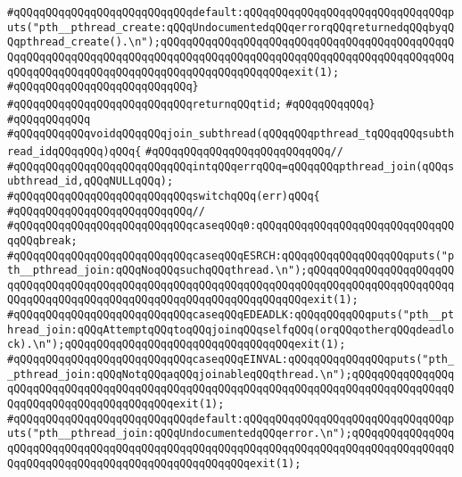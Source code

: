 \verb|#qQQqqQQqqQQqqQQqqQQqqQQqqQQqdefault:qQQqqQQqqQQqqQQqqQQqqQQqqQQqqQQqputs("pth__pthread_create:qQQqUndocumentedqQQqerrorqQQqreturnedqQQqbyqQQqpthread_create().\n");qQQqqQQqqQQqqQQqqQQqqQQqqQQqqQQqqQQqqQQqqQQqqQQqqQQqqQQqqQQqqQQqqQQqqQQqqQQqqQQqqQQqqQQqqQQqqQQqqQQqqQQqqQQqqQQqqQQqqQQqqQQqqQQqqQQqqQQqqQQqqQQqqQQqqQQqqQQqqQQqexit(1);|\newline
\verb|#qQQqqQQqqQQqqQQqqQQqqQQqqQQq}|\newline
\verb|#qQQqqQQqqQQqqQQqqQQqqQQqqQQqreturnqQQqtid;|\newline
\verb|#qQQqqQQqqQQq}|\newline
\verb|#qQQqqQQqqQQq|\newline
\verb|#qQQqqQQqqQQqvoidqQQqqQQqjoin_subthread(qQQqqQQqpthread_tqQQqqQQqsubthread_idqQQqqQQq)qQQq{|\newline
\verb|#qQQqqQQqqQQqqQQqqQQqqQQqqQQq//|\newline
\verb|#qQQqqQQqqQQqqQQqqQQqqQQqqQQqintqQQqerrqQQq=qQQqqQQqpthread_join(qQQqsubthread_id,qQQqNULLqQQq);|\newline
\verb|#qQQqqQQqqQQqqQQqqQQqqQQqqQQqswitchqQQq(err)qQQq{|\newline
\verb|#qQQqqQQqqQQqqQQqqQQqqQQqqQQq//|\newline
\verb|#qQQqqQQqqQQqqQQqqQQqqQQqqQQqcaseqQQq0:qQQqqQQqqQQqqQQqqQQqqQQqqQQqqQQqqQQqbreak;|\newline
\verb|#qQQqqQQqqQQqqQQqqQQqqQQqqQQqcaseqQQqESRCH:qQQqqQQqqQQqqQQqqQQqputs("pth__pthread_join:qQQqNoqQQqsuchqQQqthread.\n");qQQqqQQqqQQqqQQqqQQqqQQqqQQqqQQqqQQqqQQqqQQqqQQqqQQqqQQqqQQqqQQqqQQqqQQqqQQqqQQqqQQqqQQqqQQqqQQqqQQqqQQqqQQqqQQqqQQqqQQqqQQqqQQqqQQqqQQqqQQqexit(1);|\newline
\verb|#qQQqqQQqqQQqqQQqqQQqqQQqqQQqcaseqQQqEDEADLK:qQQqqQQqqQQqputs("pth__pthread_join:qQQqAttemptqQQqtoqQQqjoinqQQqselfqQQq(orqQQqotherqQQqdeadlock).\n");qQQqqQQqqQQqqQQqqQQqqQQqqQQqqQQqqQQqexit(1);|\newline
\verb|#qQQqqQQqqQQqqQQqqQQqqQQqqQQqcaseqQQqEINVAL:qQQqqQQqqQQqqQQqputs("pth__pthread_join:qQQqNotqQQqaqQQqjoinableqQQqthread.\n");qQQqqQQqqQQqqQQqqQQqqQQqqQQqqQQqqQQqqQQqqQQqqQQqqQQqqQQqqQQqqQQqqQQqqQQqqQQqqQQqqQQqqQQqqQQqqQQqqQQqqQQqqQQqqQQqexit(1);|\newline
\verb|#qQQqqQQqqQQqqQQqqQQqqQQqqQQqdefault:qQQqqQQqqQQqqQQqqQQqqQQqqQQqqQQqputs("pth__pthread_join:qQQqUndocumentedqQQqerror.\n");qQQqqQQqqQQqqQQqqQQqqQQqqQQqqQQqqQQqqQQqqQQqqQQqqQQqqQQqqQQqqQQqqQQqqQQqqQQqqQQqqQQqqQQqqQQqqQQqqQQqqQQqqQQqqQQqqQQqqQQqqQQqexit(1);|\newline

